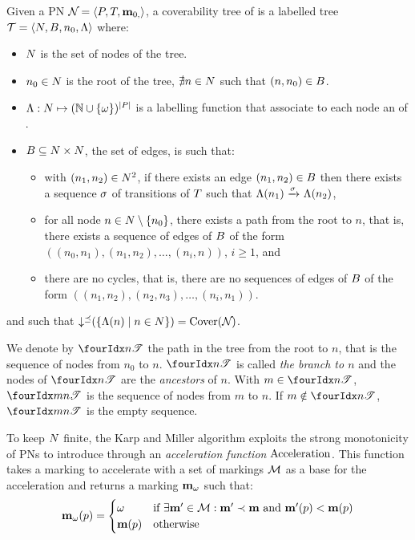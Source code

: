 \begin{defi}
  Given a \ac{PN} $\mathcal{N}_{} = \left\langle P_{}, T_{}, \mathbf{m}_{0,}\right\rangle$, a coverability tree \nameT of \namePN is a labelled tree $\mathcal{T} = \left\langle N, B, n_0, \operatorname{\Lambda}\right\rangle$ where:
  \begin{itemize}
    \item $N$ is the set of nodes of the tree.%

    \item $n_0 \in N$ is the root of the tree,  $\nexists n \in N$ such that $(n, n_0) \in B$.

    \item $\operatorname{\Lambda} : N \mapsto (\mathbb{N} \cup \{\omega\})^{\left|P\right|}$ is a labelling function that associate to each node an \omark of \namePN.

    \item $B \subseteq N \times N$, the set of edges, is such that:
      \begin{itemize}
        \item with $(n_1, n_2) \in N^2$, if there exists an edge $(n_1, n_2) \in B$ then there exists a sequence $\seqt$ of transitions of $T$ such that $\lab{n_1} \fire{\seqt} \lab{n_2}$,
        \item for all node $n \in N \setminus \{n_0\}$, there exists a path from the root to $n$, that is, there exists a sequence of edges of $B$ of the form $((n_0, n_1), (n_1, n_2), \dots, (n_{i}, n))$, $i \geq 1$, and
        \item there are no cycles, that is, there are no sequences of edges of $B$ of the form $((n_1, n_2), (n_2, n_3), \dots, (n_i, n_1))$.
      \end{itemize}
  \end{itemize}
  and such that $\operatorname{\downarrow^\preceq}(\left\{\operatorname{\Lambda}(n) \mid n \in N\right\}) = \operatorname{Cover}(\mathcal{N}_{})$.
\end{defi}

We denote by $\treepath{n}$ the path in the tree from the root to $n$, that is the sequence of nodes from $n_0$ to $n$.
$\treepath{n}$ is called \emph{the branch to $n$} and the nodes of $\treepath{n}$ are the \emph{ancestors} of $n$.
With $m \in \treepath{n}$, $\treepath[m]{n}$ is the sequence of nodes from $m$ to $n$.
If $m \notin \treepath{n}$, $\treepath[m]{n}$ is the empty sequence.

To keep $N$ finite, the Karp and Miller algorithm exploits the strong monotonicity of \acp{PN} to introduce \omarks through an \emph{acceleration function} $\operatorname{Acceleration}$.
This function takes a marking \mar to accelerate with a set of markings $\mathcal{M}$ as a base for the acceleration and returns a marking $\mathbf{m}_\omega$ such that:
\[
  \mathbf{m}_\omega(p) =
  \begin{cases}
    \omega  &\text{if } \exists \mathbf{m}' \in \mathcal{M} : \mathbf{m}' \prec \mathbf{m} \text{ and } \mathbf{m}'(p) < \mathbf{m}(p) \\
    \mathbf{m}(p) &\text{otherwise}
  \end{cases}
\]

